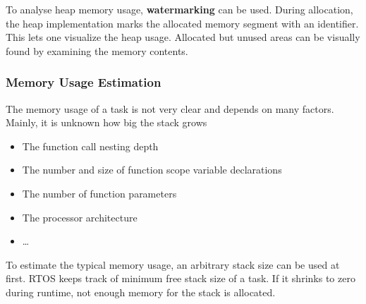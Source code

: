 To analyse heap memory usage, \textbf{watermarking} can be used.
During allocation, the heap implementation marks the allocated memory segment with an identifier.
This lets one visualize the heap usage.
Allocated but unused areas can be visually found by examining the memory contents.

\subsubsection{Memory Usage Estimation}

The memory usage of a task is not very clear and depends on many factors.
Mainly, it is unknown how big the stack grows
\begin{itemize}
  \item The function call nesting depth
  \item The number and size of function scope variable declarations
  \item The number of function parameters
  \item The processor architecture
  \item \dots
\end{itemize}
To estimate the typical memory usage, an arbitrary stack size can be used at first.
RTOS keeps track of minimum free stack size of a task.
If it shrinks to zero during runtime, not enough memory for the stack is allocated. 
